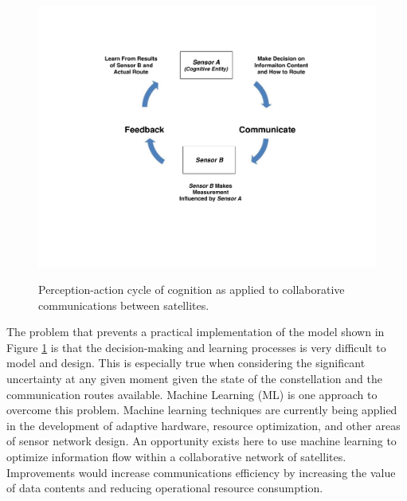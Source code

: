 \documentclass[conference]{IEEEtran}
\begin{document}
\begin{figure}[b!]
  \begin{center}
    \includegraphics[width=0.9\linewidth] {images/Figure2.pdf} \\
  \end{center}
  \caption{Perception-action cycle of cognition as applied to collaborative communications between satellites.}
  \label{fig:figure2}
\end{figure}



The problem that prevents a practical implementation of the model shown in Figure \ref{fig:figure2} is that the decision-making and learning processes is very difficult to model and design.  This is especially true when considering the significant uncertainty at any given moment given the state of the constellation and the communication routes available.  Machine Learning (ML) is one approach to overcome this problem.  Machine learning techniques are currently being applied in the development of adaptive hardware, resource optimization, and other areas of sensor network design.  An opportunity exists here to use machine learning to optimize information flow within a collaborative network of satellites.  Improvements would increase communications efficiency by increasing the value of data contents and reducing operational resource consumption.
\end{document}
